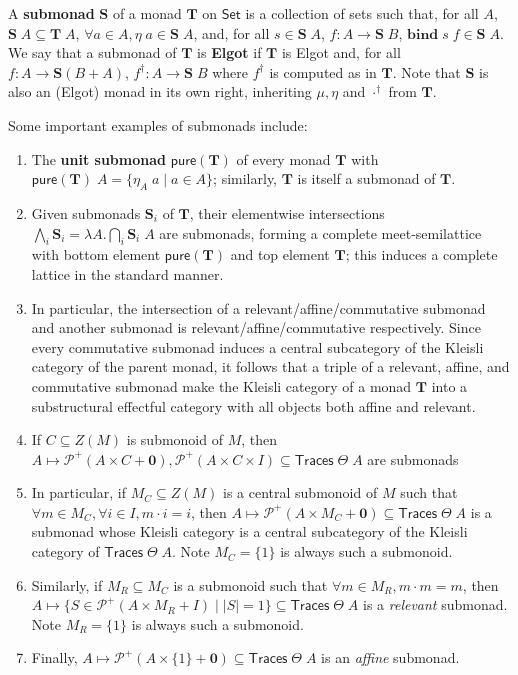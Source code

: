 \documentclass[acmsmall,screen,review]{acmart}
\newcommand{\mc}[1]{\ensuremath{\mathcal{#1}}}
\newcommand{\mb}[1]{\ensuremath{\mathbf{#1}}}
\newcommand{\ms}[1]{\ensuremath{\mathsf{#1}}}
\begin{document}
\begin{definition}[Submonad] 
  A \textbf{submonad} \(\mb{S}\) of a monad \(\mb{T}\) on \(\ms{Set}\) is a
  collection of sets such that, for all \(A\), \(\mb{S}\;A \subseteq
  \mb{T}\;A\), \(\forall a \in A, \eta\;a \in \mb{S}\;A\), and, for all \(s \in
  \mb{S}\;A\), \(f: A \to \mb{S}\;B\), \(\mb{bind}\;s\;f \in \mb{S}\;A\). We say
  that a submonad of \(\mb{T}\) is \textbf{Elgot} if \(\mb{T}\) is Elgot and,
  for all \(f: A \to \mb{S}(B + A)\), \(f^\dagger: A \to \mb{S}\;B\) where
  \(f^\dagger\) is computed as in \(\mb{T}\). Note that \(\mb{S}\) is also an
  (Elgot) monad in its own right, inheriting \(\mu, \eta\) and \(\cdot^\dagger\)
  from \(\mb{T}\).
\end{definition}
Some important examples of submonads include:
\begin{enumerate}
  \item The \textbf{unit submonad} \(\ms{pure}(\mb{T})\) of every monad
  \(\mb{T}\) with \(\ms{pure}(\mb{T})\;A = \{\eta_A\;a \mid a \in A\}\);
  similarly, \(\mb{T}\) is itself a submonad of \(\mb{T}\).
  \item Given submonads \(\mb{S}_i\) of \(\mb{T}\), their elementwise
  intersections \(\bigwedge_i\mb{S}_i = \lambda A. \bigcap_i \mb{S}_i\;A\) are
  submonads, forming a complete meet-semilattice with bottom element
  \(\ms{pure}(\mb{T})\) and top element \(\mb{T}\); this induces a complete
  lattice in the standard manner.
  \item In particular, the intersection of a relevant/affine/commutative
  submonad and another submonad is relevant/affine/commutative respectively.
  Since every commutative submonad induces a central subcategory of the Kleisli
  category of the parent monad, it follows that a triple of a relevant, affine,
  and commutative submonad make the Kleisli category of a monad \(\mb{T}\) into
  a substructural effectful category with all objects both affine and relevant.
  \item If \(C \subseteq Z(M)\) is submonoid of \(M\), then \(A \mapsto
  \mc{P}^+(A \times C + \mb{0}), \mc{P}^+(A \times C \times I) \subseteq
  \ms{Traces}\;\Theta\;A\) are submonads
  \item In particular, if \(M_C \subseteq Z(M)\) is a central submonoid of \(M\)
  such that \(\forall m \in M_C, \forall i \in I, m \cdot i = i\), then \(A
  \mapsto \mc{P}^+(A \times M_C + \mb{0}) \subseteq \ms{Traces}\;\Theta\;A\) is
  a submonad whose Kleisli category is a central subcategory of the Kleisli
  category of \(\ms{Traces}\;\Theta\;A\). Note \(M_C = \{1\}\) is always such a
  submonoid.
  \label{item:central-submonad}
  \item Similarly, if \(M_R \subseteq M_C\) is a submonoid such that \(\forall m
  \in M_R, m \cdot m = m\), then \(A \mapsto \{S \in \mc{P}^+(A \times M_R + I)
  \mid |S| = 1\} \subseteq \ms{Traces}\;\Theta\;A\) is a \textit{relevant}
  submonad. Note \(M_R = \{1\}\) is always such a submonoid.
  \label{item:relevant-submonad}
  \item Finally, \(A \mapsto \mc{P}^+(A \times \{1\} + \mb{0}) \subseteq
  \ms{Traces}\;\Theta\;A\) is an \textit{affine} submonad.
  \label{item:affine-submonad}
\end{enumerate}
\end{document}
